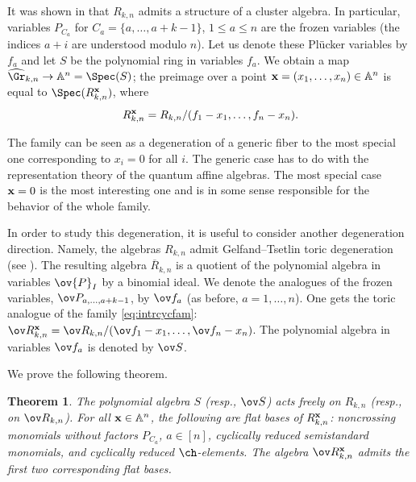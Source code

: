 \documentclass[11pt]{amsart}
\numberwithin{equation}{section}
\newtheorem{theoremA}{Theorem}
\newcommand{\bA}{{\mathbb A}}
\newcommand{\bfx}{{\bf x}}
\begin{document}
It was shown 
in \cite{Sc06} that $R_{k,n}$ admits a structure of a cluster algebra. In particular,
variables $P_{C_a}$ for $C_a=\{a,\dots,a+k-1\}$, $1\le a\le n$ are the frozen variables (the indices
$a+i$ are understood modulo $n$). Let us denote these Pl\"ucker variables by $f_a$
and let $S$ be the polynomial ring in variables $f_a$. 
We obtain a map $\widehat\Gr_{k,n}\to \bA^n=\Spec(S)$; the preimage over a point 
$\bfx = (x_1,\dots,x_n)\in \bA^n$ is equal to $\Spec(R_{k,n}^\bfx)$, where
\begin{equation}\label{eq:intrcycfam}
R_{k,n}^\bfx = R_{k,n}/(f_1-x_1,\dots,f_n-x_n).
\end{equation}

The family can be seen as a degeneration of a generic fiber to the 
most special one corresponding to  $x_i=0$ for all $i$. The generic case
has to do with the representation theory of the quantum affine algebras.  
The most special
case $\bfx=0$ is the most interesting one and is in some sense responsible for 
the behavior of the whole family.

In order to study this degeneration, it is useful to consider another degeneration direction.
Namely, the algebras $R_{k,n}$ admit Gelfand--Tsetlin toric degeneration 
(see \cite{GL96,KM05,Stu93,SZ93}). The resulting algebra $\overline{R}_{k,n}$ is a quotient 
of the polynomial algebra in variables $\ov{P}_I$ by a binomial ideal. We denote the
analogues of the frozen variables, $\ov P_{a,\dots,a+k-1}$, by $\ov f_a$ (as before, 
$a=1,\dots,n$). One gets the toric analogue of the family \eqref{eq:intrcycfam}:
$\ov R_{k,n}^\bfx = \ov R_{k,n}/(\ov f_1-x_1,\dots,\ov f_n-x_n)$.
The polynomial algebra in variables $\ov f_a$ is denoted by $\ov S$.

We prove the following theorem. 
\begin{theoremA}
The polynomial algebra $S$ (resp., $\ov S$) acts freely
on $R_{k,n}$ (resp., on $\ov R_{k,n}$).
For all $\bfx\in\bA^n$, the following are flat bases
of $R^\bfx_{k,n}$: noncrossing monomials without
factors $P_{C_a}$, $a\in[n]$, cyclically reduced
semistandard monomials, and cyclically reduced
$\ch$-elements.
The algebra $\ov R^\bfx_{k,n}$ admits the first
two corresponding flat bases.
\end{theoremA}
\end{document}
